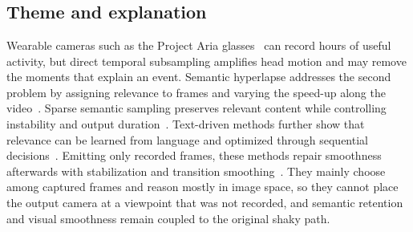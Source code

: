 \documentclass[
	mscproposta, %
	english %
]{../ppgccufmg}
\begin{document}
			
			
			
			

    \setlength{\afterchapskip}{0.6cm}
    \chapter{}
    \section{Theme and explanation}
        Wearable cameras such as the Project Aria glasses~\cite{engel2023aria} can record hours of useful activity, but direct temporal subsampling amplifies head motion and may remove the moments that explain an event. Semantic hyperlapse addresses the second problem by assigning relevance to frames and varying the speed-up along the video~\cite{ramos2016fastforward}. Sparse semantic sampling preserves relevant content while controlling instability and output duration~\cite{silva2018weighted,silva2021sparse}. Text-driven methods further show that relevance can be learned from language and optimized through sequential decisions~\cite{ramos2020straight,ramos2022text}. Emitting only recorded frames, these methods repair smoothness afterwards with stabilization and transition smoothing~\cite{silva2016towards,silva2018weighted}. They mainly choose among captured frames and reason mostly in image space, so they cannot place the output camera at a viewpoint that was not recorded, and semantic retention and visual smoothness remain coupled to the original shaky path.
\end{document}

